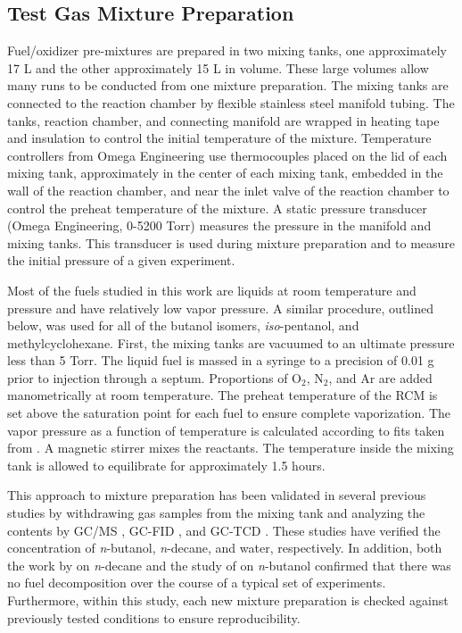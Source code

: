 \documentclass[12pt, letterpaper]{article}
\begin{document}
\subsection{Test Gas Mixture Preparation}

Fuel/oxidizer pre-mixtures are prepared in two mixing tanks, one approximately
17 L and the other approximately 15 L in volume. These large volumes allow many
runs to be conducted from one mixture preparation. The mixing tanks are connected
to the reaction chamber by flexible stainless steel manifold tubing. The tanks, reaction chamber,
and connecting manifold are wrapped in heating tape and insulation to control the initial
temperature of the mixture. Temperature controllers from Omega Engineering use thermocouples
placed on the lid of each mixing tank, approximately in the center of each mixing tank, embedded in
the wall of the reaction chamber, and near the inlet valve of the reaction chamber to control the
preheat temperature of the mixture. A static pressure transducer (Omega Engineering, 0-5200 Torr)
measures the pressure in the manifold and mixing tanks. This transducer is used
during mixture preparation and to measure the initial pressure of a given experiment.

Most of the fuels studied in this work are liquids at room temperature and
pressure and have relatively low vapor pressure. A similar procedure, outlined
below, was used for all of the butanol isomers, \textit{iso}-pentanol, and
methylcyclohexane. First, the mixing tanks are vacuumed to an ultimate pressure
less than 5 Torr. The liquid fuel is massed in a syringe to a precision of
0.01 g prior to injection through a septum. Proportions of O$_2$, N$_2$, and
Ar are added manometrically at room temperature. The preheat temperature of
the RCM is set above the saturation point for each fuel to ensure complete
vaporization. The vapor pressure as a function of temperature is calculated
according to fits taken from \textcite{Yaws1999}. A magnetic stirrer mixes
the reactants. The temperature inside the mixing tank is allowed to
equilibrate for approximately 1.5 hours.

This approach to mixture preparation has been validated in several previous
studies by withdrawing gas samples from the mixing tank and analyzing the
contents by GC/MS \cite{Weber2011}, GC-FID \cite{Kumar2009}, and GC-TCD
\cite{Das2012}. These studies have verified the concentration of
\textit{n}-butanol, \textit{n}-decane, and water, respectively. In addition,
both the work by \textcite{Kumar2009} on \textit{n}-decane and the study of
\textcite{Weber2011} on \textit{n}-butanol confirmed that there was no fuel
decomposition over the course of a typical set of experiments. Furthermore,
within this study, each new mixture preparation is checked against previously
tested conditions to ensure reproducibility.
\end{document}
